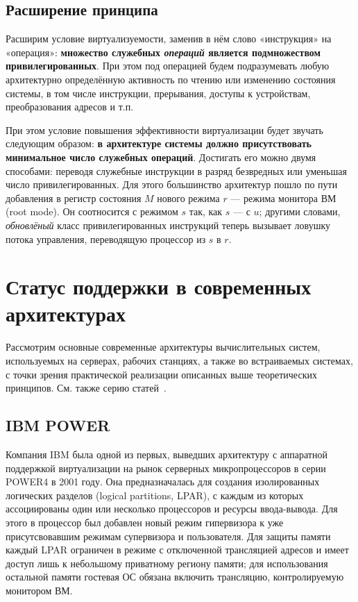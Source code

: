 \subsection{Расширение принципа}

Расширим условие виртуализуемости, заменив в нём слово «инструкция» на «операция»: \textbf{множество служебных \emph{операций} является подмножеством привилегированных}. При этом под операцией будем подразумевать любую архитектурно определённую активность по чтению или изменению состояния системы, в том числе инструкции, прерывания, доступы к устройствам, преобразования адресов и т.п.

При этом условие повышения эффективности виртуализации будет звучать следующим образом: \textbf{в архитектуре системы должно присутствовать минимальное число служебных операций}. Достигать его можно двумя способами: переводя служебные инструкции в разряд безвредных или уменьшая число привилегированных. Для этого большинство архитектур пошло по пути добавления в регистр состояния $M$ нового режима $r$ --- режима монитора ВМ (\abbr root mode). Он соотносится с режимом $s$ так, как $s$ --- с $u$; другими словами, \emph{обновлёный} класс привилегированных инструкций теперь вызывает ловушку потока управления, переводящую процессор из $s$ в $r$.

\section{Статус поддержки в современных архитектурах}

Рассмотрим основные современные архитектуры вычислительных систем, используемых на серверах, рабочих станциях, а также во встраиваемых системах, с точки зрения практической реализации описанных выше теоретических принципов. См. также серию статей~\cite{mpr-03-05-07-01,mpr-03-12-07-01,mpr-03-26-07-01}.

\subsection{IBM POWER}

Компания IBM была одной из первых, выведших архитектуру с аппаратной поддержкой виртуализации на рынок серверных микропроцессоров в серии POWER4 в 2001 году. Она предназначалась для создания изолированных логических разделов (\abbr logical partitions, LPAR), с каждым из которых ассоциированы один или несколько процессоров и ресурсы ввода-вывода. Для этого в процессор был добавлен новый режим гипервизора к уже присутсвовавшим режимам супервизора и пользователя. Для защиты памяти каждый LPAR ограничен в режиме с отключенной трансляцией адресов и имеет доступ лишь к небольшому приватному региону памяти; для использования остальной памяти гостевая ОС обязана включить трансляцию, контролируемую монитором ВМ.

